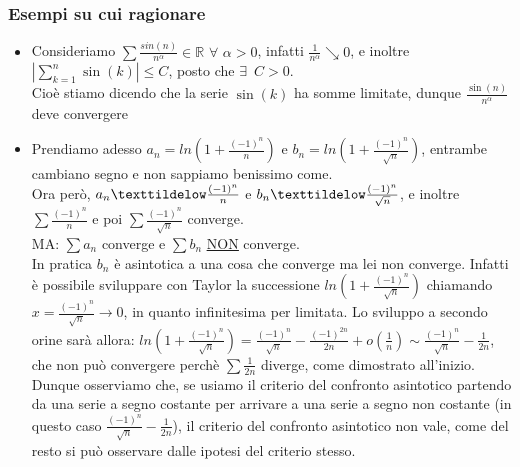\documentclass{article}
\theoremstyle{definition}
\newcommand{\R}{\mathbb{R}}
\begin{document}
\subsubsection{Esempi su cui ragionare}
\begin{itemize}
    \item Consideriamo $\sum \frac{sin(n)}{n^\alpha} \in \R \,\, \forall \,\, \alpha >0$, infatti $\frac{1}{n^\alpha} \searrow 0$, e inoltre $|\sum_{k=1}^n \sin(k)| \leqslant C$, posto che $\exists \,\,\, C > 0$.
    \\
    Cioè stiamo dicendo che la serie $\sin(k)$ ha somme limitate, dunque $\frac{\sin(n)}{n^\alpha}$ deve convergere
    \item Prendiamo adesso $a_n = ln(1+\frac{(-1)^n}{n})$ e $b_n=ln(1+ \frac{(-1)^n}{\sqrt{n}})$, entrambe cambiano segno e non sappiamo benissimo come.
    \\
    Ora però, $a_n \texttildelow \frac{(-1)^n}{n}$ e $b_n \texttildelow \frac{(-1)^n}{\sqrt{n}}$, e inoltre $\sum \frac{(-1)^n}{n}$ e poi $\sum \frac{(-1)^n}{\sqrt{n}}$ converge.
    \\
    MA: $\sum a_n$ converge e $\sum b_n$ \underline{\underline{NON}} converge.
    \\
    In pratica $b_n$ è asintotica a una cosa che converge ma lei non converge. Infatti è possibile sviluppare con Taylor la successione $ln(1+ \frac{(-1)^n}{\sqrt{n}})$ chiamando $x=\frac{(-1)^n}{\sqrt{n}} \to 0$, in quanto infinitesima per limitata. Lo sviluppo a secondo orine sarà allora: $ln(1+ \frac{(-1)^n}{\sqrt{n}})=\frac{(-1)^n}{\sqrt{n}}-\frac{(-1)^{2n}}{2n}+o(\frac{1}{n}) \sim \frac{(-1)^n}{\sqrt{n}}-\frac{1}{2n}$, che non può convergere perchè $\sum\frac{1}{2n}$ diverge, come dimostrato all'inizio. Dunque osserviamo che, se usiamo il criterio del confronto asintotico partendo da una serie a segno costante per arrivare a una serie a segno non costante (in questo caso $\frac{(-1)^n}{\sqrt{n}}-\frac{1}{2n}$), il criterio del confronto asintotico non vale, come del resto si può osservare dalle ipotesi del criterio stesso.
\end{itemize}
\end{document}
